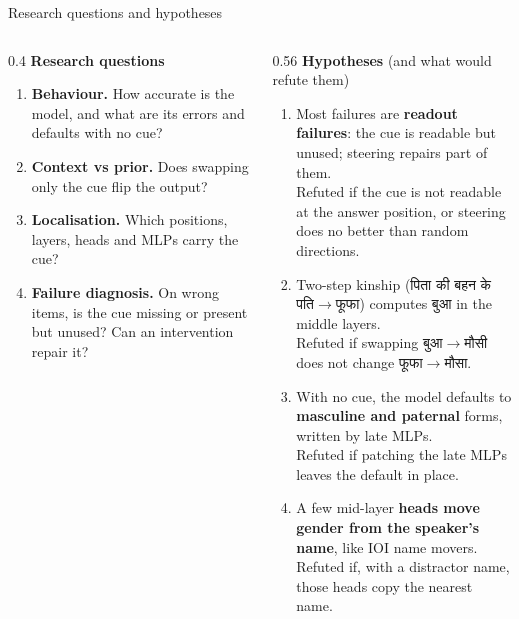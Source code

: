\documentclass[aspectratio=169,10pt]{beamer}
\newcommand{\hi}[1]{{\devfont #1}}
\begin{document}
\begin{frame}{Research questions and hypotheses}
\begin{columns}[T]
\begin{column}{0.4\textwidth}
\small
\textbf{Research questions}
\begin{enumerate}
  \setlength\itemsep{0.35em}
  \item[\textbf{RQ1}] \textbf{Behaviour.} How accurate is the model, and what are its errors and defaults with no cue?
  \item[\textbf{RQ2}] \textbf{Context vs prior.} Does swapping only the cue flip the output?
  \item[\textbf{RQ3}] \textbf{Localisation.} Which positions, layers, heads and MLPs carry the cue?
  \item[\textbf{RQ4}] \textbf{Failure diagnosis.} On wrong items, is the cue missing or present but unused? Can an intervention repair it?
\end{enumerate}
\end{column}
\begin{column}{0.56\textwidth}
\footnotesize
\textbf{Hypotheses} \textcolor{muted}{(and what would refute them)}
\begin{enumerate}
  \setlength\itemsep{0.1em}
  \item[\textbf{H1}] Most failures are \textbf{readout failures}: the cue is readable but unused; steering repairs part of them.\\
    {\footnotesize\textcolor{muted}{Refuted if the cue is not readable at the answer position, or steering does no better than random directions.}}
  \item[\textbf{H2}] Two-step kinship (\hi{पिता की बहन के पति}\(\to\)\hi{फूफा}) computes \hi{बुआ} in the middle layers.\\
    {\footnotesize\textcolor{muted}{Refuted if swapping \hi{बुआ}\(\to\)\hi{मौसी} does not change \hi{फूफा}\(\to\)\hi{मौसा}.}}
  \item[\textbf{H3}] With no cue, the model defaults to \textbf{masculine and paternal} forms, written by late MLPs.\\
    {\footnotesize\textcolor{muted}{Refuted if patching the late MLPs leaves the default in place.}}
  \item[\textbf{H4}] A few mid-layer \textbf{heads move gender from the speaker's name}, like IOI name movers.\\
    {\footnotesize\textcolor{muted}{Refuted if, with a distractor name, those heads copy the nearest name.}}
\end{enumerate}
\end{column}
\end{columns}
\end{frame}
\end{document}
